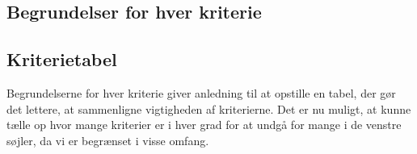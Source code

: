 \subsection{Begrundelser for hver kriterie}


\subsection{Kriterietabel}
Begrundelserne for hver kriterie giver anledning til at opstille en tabel, der gør det lettere, at sammenligne vigtigheden af kriterierne. Det er nu muligt, at kunne tælle op hvor mange kriterier er i hver grad for at undgå for mange i de venstre søjler, da vi er begrænset i visse omfang.


